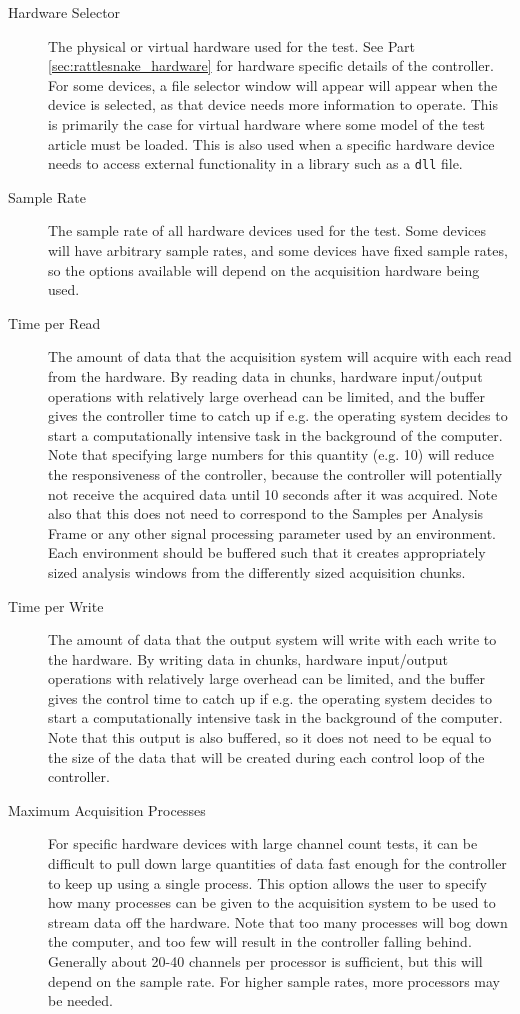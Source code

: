 \documentclass[pdf,12pt,report]{SANDreport}
\newcommand{\inlineCode}{\lstinline[basicstyle=\bfseries\ttfamily]}
\begin{document}
    \begin{description}
        \item[Hardware Selector] The physical or virtual hardware used for the test.  See Part \ref{sec:rattlesnake_hardware} for hardware specific details of the controller.  For some devices, a file selector window will appear will appear when the device is selected, as that device needs more information to operate.  This is primarily the case for virtual hardware where some model of the test article must be loaded.  This is also used when a specific hardware device needs to access external functionality in a library such as a \inlineCode{dll} file.
        \item[Sample Rate] The sample rate of all hardware devices used for the test.  Some devices will have arbitrary sample rates, and some devices have fixed sample rates, so the options available will depend on the acquisition hardware being used.
        \item[Time per Read] The amount of data that the acquisition system will acquire with each read from the hardware.  By reading data in chunks, hardware input/output operations with relatively large overhead can be limited, and the buffer gives the controller time to catch up if e.g. the operating system decides to start a computationally intensive task in the background of the computer.  Note that specifying large numbers for this quantity (e.g. 10) will reduce the responsiveness of the controller, because the controller will potentially not receive the acquired data until 10 seconds after it was acquired.  Note also that this does not need to correspond to the Samples per Analysis Frame or any other signal processing parameter used by an environment.  Each environment should be buffered such that it creates appropriately sized analysis windows from the differently sized acquisition chunks.
        \item[Time per Write] The amount of data that the output system will write with each write to the hardware.  By writing data in chunks, hardware input/output operations with relatively large overhead can be limited, and the buffer gives the control time to catch up if e.g. the operating system decides to start a computationally intensive task in the background of the computer.   Note that this output is also buffered, so it does not need to be equal to the size of the data that will be created during each control loop of the controller.
        \item[Maximum Acquisition Processes] For specific hardware devices with large channel count tests, it can be difficult to pull down large quantities of data fast enough for the controller to keep up using a single process.  This option allows the user to specify how many processes can be given to the acquisition system to be used to stream data off the hardware.  Note that too many processes will bog down the computer, and too few will result in the controller falling behind.  Generally about 20-40 channels per processor is sufficient, but this will depend on the sample rate.  For higher sample rates, more processors may be needed.

\end{description}
\end{document}
